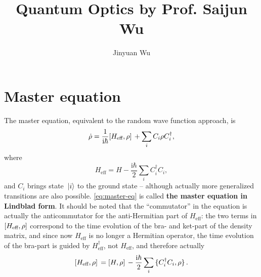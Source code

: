\documentclass[hyperref, a4paper]{article}
\title{Quantum Optics by Prof. Saijun Wu}
\author{Jinyuan Wu}
\newcommand*{\ii}{\mathrm{i}}
\newcommand*{\concept}[1]{{\textbf{#1}}}
\begin{document}
\maketitle

\section{Master equation}

The master equation, equivalent to the random wave function approach, is 
\begin{equation}
    \dot{\rho} = \frac{1}{\ii \hbar} \comm*{H_\text{eff}}{\rho} + \sum_i C_i \rho C_i^\dagger,
    \label{eq:master-eq}
\end{equation}
where 
\begin{equation}
    H_\text{eff} = H - \frac{\ii \hbar}{2} \sum_i C_i^\dagger C_i,
\end{equation}
and $C_i$ brings state $\ket*{i}$ to the ground state -- 
although actually more generalized transitions are also possible.
\eqref{eq:master-eq} is called \concept{the master equation in Lindblad form}.
It should be noted that the ``commutator'' in the equation 
is actually the anticommutator for the  anti-Hermitian part of $H_{\text{eff}}$:
the two terms in $\comm{H_{\text{eff}}}{\rho}$ 
correspond to the time evolution of the bra- and ket-part of the density matrix,
and since now $H_{\text{eff}}$ is no longer a Hermitian operator,
the time evolution of the bra-part is guided by $H_{\text{eff}}^\dagger$, 
not $H_{\text{eff}}$,
and therefore actually 
\[
    \comm*{H_{\text{eff}}}{\rho} = 
    \comm*{H}{\rho} - \frac{\ii \hbar}{2}
    \sum_i \acomm*{C_i^\dagger C_i}{\rho}.
\]
\end{document}
